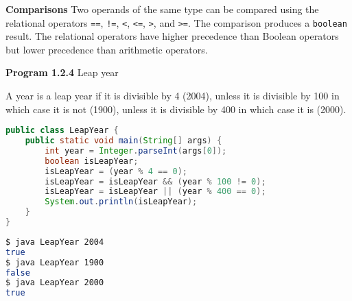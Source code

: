 \documentclass[8pt,a4paper,compress]{beamer}
\begin{document}
\begin{frame}[fragile]
\begin{center}
\begin{tabular}{ccc}
\end{tabular}
\end{center}

\pause
\smallskip

\textbf{Comparisons} Two operands of the same type can be compared using the relational operators \lstinline$==$, \lstinline$!=$, \lstinline$<$, \lstinline$<=$, \lstinline$>$, and \lstinline$>=$. The comparison produces a \lstinline$boolean$ result. The relational operators have higher precedence than Boolean operators but lower precedence than arithmetic operators.
\end{frame}

\begin{frame}[fragile]
\pause

\textbf{Program 1.2.4} Leap year
\begin{framed}
\tiny A year is a leap year if it is divisible by 4 (2004), unless it is divisible by 100 in which case it is not (1900), unless it is divisible by 400 in which case it is (2000).
\end{framed}

\begin{lstlisting}[language=Java]
public class LeapYear { 
    public static void main(String[] args) { 
        int year = Integer.parseInt(args[0]);
        boolean isLeapYear;
        isLeapYear = (year % 4 == 0);
        isLeapYear = isLeapYear && (year % 100 != 0);
        isLeapYear = isLeapYear || (year % 400 == 0);
        System.out.println(isLeapYear);
    }
}
\end{lstlisting}

\pause

\begin{lstlisting}[language=bash]
$ java LeapYear 2004
true
$ java LeapYear 1900
false
$ java LeapYear 2000
true
\end{lstlisting}
\end{frame}
\end{document}
